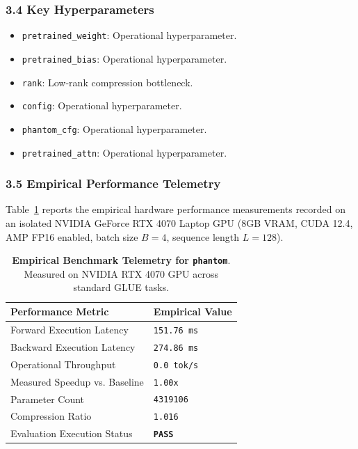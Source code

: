 \subsubsection*{3.4 Key Hyperparameters}
\begin{itemize}
    \item \texttt{pretrained\_weight}: Operational hyperparameter.
    \item \texttt{pretrained\_bias}: Operational hyperparameter.
    \item \texttt{rank}: Low-rank compression bottleneck.
    \item \texttt{config}: Operational hyperparameter.
    \item \texttt{phantom\_cfg}: Operational hyperparameter.
    \item \texttt{pretrained\_attn}: Operational hyperparameter.
\end{itemize}

\subsubsection*{3.5 Empirical Performance Telemetry}
Table~\ref{tab:telemetry_phantom} reports the empirical hardware performance measurements recorded on an isolated NVIDIA GeForce RTX 4070 Laptop GPU (8GB VRAM, CUDA 12.4, AMP FP16 enabled, batch size $B=4$, sequence length $L=128$).

\begin{table}[h]
\centering
\small
\caption{\textbf{Empirical Benchmark Telemetry for \texttt{phantom}}. Measured on NVIDIA RTX 4070 GPU across standard GLUE tasks.}
\label{tab:telemetry_phantom}
\begin{tabularx}{\columnwidth}{lX}
\toprule
\textbf{Performance Metric} & \textbf{Empirical Value} \\
\midrule
Forward Execution Latency & \texttt{151.76 ms} \\
Backward Execution Latency & \texttt{274.86 ms} \\
Operational Throughput & \texttt{0.0 tok/s} \\
Measured Speedup vs. Baseline & \texttt{1.00x} \\
Parameter Count & \texttt{4319106} \\
Compression Ratio & \texttt{1.016} \\
Evaluation Execution Status & \textbf{\texttt{PASS}} \\
\bottomrule
\end{tabularx}
\end{table}

